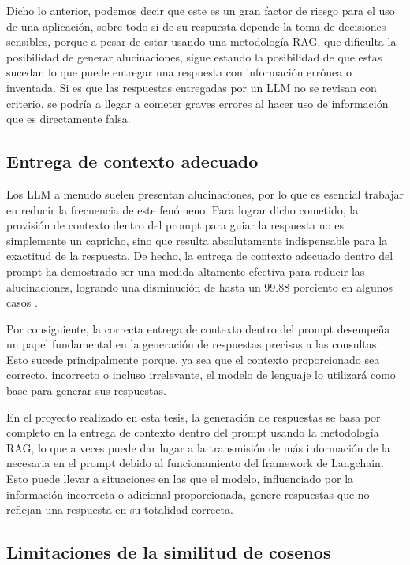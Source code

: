 Dicho lo anterior, podemos decir que este es un gran factor de riesgo para el uso de una aplicación, sobre todo si de su respuesta depende la toma de decisiones sensibles, porque a pesar de estar usando una 
metodología RAG, que dificulta la posibilidad de generar alucinaciones, sigue estando la posibilidad de que estas sucedan lo que puede 
entregar una respuesta con información errónea o inventada. Si es que las respuestas entregadas por un LLM no se revisan con criterio, se podría a llegar a cometer graves errores al hacer uso de información que es directamente falsa.


\subsection{Entrega de contexto adecuado}

Los LLM a menudo suelen presentan alucinaciones, por lo que es esencial trabajar en reducir la frecuencia de este fenómeno. 
Para lograr dicho cometido, la provisión de contexto dentro del prompt para guiar la respuesta no es simplemente un capricho, sino que resulta 
absolutamente indispensable para la exactitud de la respuesta. De hecho, la entrega de contexto adecuado dentro del prompt ha demostrado 
ser una medida altamente efectiva para reducir las alucinaciones, logrando una disminución de hasta un 
99.88 porciento en algunos casos \cite{riego1}.

Por consiguiente, la correcta entrega de contexto dentro del prompt desempeña un papel fundamental en 
la generación de respuestas precisas a las consultas. Esto sucede principalmente porque, ya sea que el contexto 
proporcionado sea correcto, incorrecto o incluso irrelevante, el modelo de lenguaje lo utilizará como base 
para generar sus respuestas.

En el proyecto realizado en esta tesis, la generación de respuestas se basa por completo en la entrega de contexto 
dentro del prompt usando la metodología RAG, lo que a veces puede dar lugar a la transmisión de más información de la necesaria en el prompt 
debido al funcionamiento del framework de Langchain. Esto puede llevar a situaciones en las que el modelo, 
influenciado por la información incorrecta o adicional proporcionada, genere respuestas que no reflejan una respuesta en su totalidad correcta.


\subsection{Limitaciones de la similitud de cosenos}

